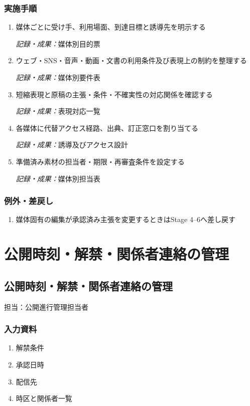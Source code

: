 \documentclass[a4paper,11pt]{article}
\begin{document}
\subsubsection*{実施手順}
\begin{enumerate}[leftmargin=2em,itemsep=0.65em]
\item 媒体ごとに受け手、利用場面、到達目標と誘導先を明示する\par\noindent\textit{記録・成果：}媒体別目的票\nobreak\smallskip
\item ウェブ・SNS・音声・動画・文書の利用条件及び表現上の制約を整理する\par\noindent\textit{記録・成果：}媒体別要件表\nobreak\smallskip
\item 短縮表現と原稿の主張・条件・不確実性の対応関係を確認する\par\noindent\textit{記録・成果：}表現対応一覧\nobreak\smallskip
\item 各媒体に代替アクセス経路、出典、訂正窓口を割り当てる\par\noindent\textit{記録・成果：}誘導及びアクセス設計\nobreak\smallskip
\item 準備済み素材の担当者・期限・再審査条件を設定する\par\noindent\textit{記録・成果：}媒体別担当表\nobreak\smallskip
\end{enumerate}
\subsubsection*{例外・差戻し}
\begin{enumerate}[leftmargin=2em,itemsep=0.35em]
\item 媒体固有の編集が承認済み主張を変更するときはStage 4–6へ差し戻す
\end{enumerate}
\section{公開時刻・解禁・関係者連絡の管理}
\subsection{公開時刻・解禁・関係者連絡の管理}
\par 担当：公開進行管理担当者\par\medskip
\subsubsection*{入力資料}
\begin{enumerate}[leftmargin=2em,itemsep=0.35em]
\item 解禁条件
\item 承認日時
\item 配信先
\item 時区と関係者一覧
\end{enumerate}
\end{document}
